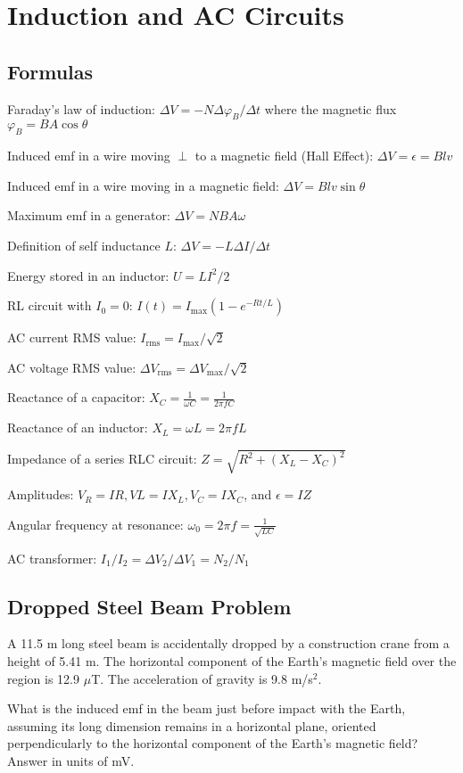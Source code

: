 \documentclass[../physics12.tex]{subfiles}
\begin{document}
\chapter{Induction and AC Circuits}
\section{Formulas}
Faraday's law of induction: $\Delta V = -N\Delta \varphi_B/\Delta t$ where the magnetic flux $\varphi_B = BA\cos\theta$

Induced emf in a wire moving $\perp$ to a magnetic field (Hall Effect): $\Delta V = \epsilon = Blv$

Induced emf in a wire moving in a magnetic field: $\Delta V = Blv\sin\theta$

Maximum emf in a generator: $\Delta V = NBA\omega$

Definition of self inductance $L$: $\Delta V = -L\Delta I/\Delta t$

Energy stored in an inductor: $U = LI^2/2$

RL circuit with $I_0 = 0$: $I(t) = I_{\text{max}}(1-e^{-Rt/L})$

AC current RMS value: $I_{\text{rms}} = I_{\text{max}}/\sqrt{2}$

AC voltage RMS value: $\Delta V_{\text{rms}} = \Delta V_{\text{max}}/\sqrt{2}$

Reactance of a capacitor: $X_C = \frac{1}{\omega C}=\frac{1}{2\pi f C}$

Reactance of an inductor: $X_L = \omega L = 2\pi f L$

Impedance of a series RLC circuit: $Z = \sqrt{R^2+(X_L-X_C)^2}$

Amplitudes: $V_R = IR, VL = IX_L, V_C = IX_C$, and $\epsilon = IZ$

Angular frequency at resonance: $\omega_0 = 2\pi f = \frac{1}{\sqrt{LC}}$

AC transformer: $I_1/I_2 = \Delta V_2/\Delta V_1 = N_2/N_1$

\section{Dropped Steel Beam Problem}
A 11.5 m long steel beam is accidentally dropped by a construction crane from a height of 5.41 m. The horizontal component of the Earth's 
magnetic field over the region is 12.9 $\mu$T. The acceleration of gravity is 9.8 m/s$^2$.

What is the induced emf in the beam just before impact with the Earth, assuming its long dimension remains in a horizontal plane, oriented perpendicularly to the horizontal component of the Earth's magnetic field? Answer in units of mV.
\end{document}
